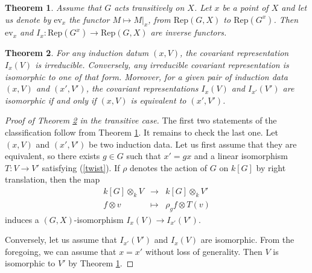 \documentclass[10pt,a4paper]{amsart}
\newtheorem{theorem}{Theorem}
\begin{document}
\begin{theorem}\label{equivalence}
    Assume that $G$ acts transitively on $X$. Let $x$ be a point of $X$ and let us denote by $\mathrm{ev}_x$ the functor $M \mapsto M|_x$, from $\mathrm{Rep}(G,X)$ to $\mathrm{Rep}(G^x)$. Then $\mathrm{ev}_x$ and $I_x : \mathrm{Rep}(G^x) \to \mathrm{Rep}(G,X)$ are inverse functors.
\end{theorem}

\begin{theorem}\label{classification}
    For any induction datum $(x,V)$, the covariant representation $I_x(V)$ is irreducible. Conversely, any irreducible covariant representation is isomorphic to one of that form. Moreover, for a given pair of induction data $(x,V)$ and $(x',V')$, the covariant representations $I_x(V)$ and $I_{x'}(V')$ are isomorphic if and only if $(x,V)$ is equivalent to $(x',V')$.
\end{theorem}

    \begin{proof}[Proof of Theorem \ref{classification} in the transitive case]
    
    The first two statements of the classification follow from Theorem \ref{equivalence}. It remains to check the last one.
    Let $(x,V)$ and $(x',V')$ be two induction data. Let us first assume that they are equivalent, so there exists $g \in G$ such that $x' = gx$ and a linear isomorphism $T : V\to V'$ satisfying (\ref{twist}). If $\rho$ denotes the action of $G$ on $k[G]$ by right translation, then the map
    $$\begin{array}{cclll}
        k[G] \otimes_k V & \longrightarrow & k[G] \otimes_kV' \\
        f \otimes v & \longmapsto & \rho_gf \otimes T(v) 
    \end{array}$$
    induces a $(G, X)$-isomorphism $I_x(V) \to I_{x'}(V')$.
    
    Conversely, let us assume that $I_{x'}(V')$ and $I_{x}(V)$ are isomorphic. From the foregoing, we can assume that $x = x'$ without loss of generality. Then $V$ is isomorphic to $V'$ by Theorem \ref{equivalence}.
\end{proof}
\end{document}
